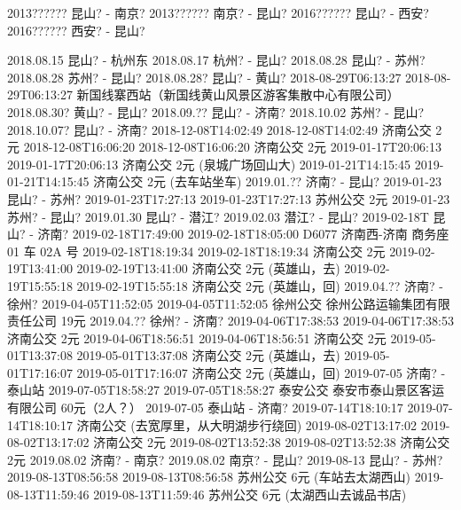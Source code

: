 2013??????       昆山? - 南京?
2013??????       南京? - 昆山?
2016??????       昆山? - 西安?
2016??????       西安? - 昆山?


2018.08.15       昆山? - 杭州东
2018.08.17       杭州? - 昆山?
2018.08.28       昆山? - 苏州?
2018.08.28       苏州? - 昆山?
2018.08.28?      昆山? - 黄山?
2018-08-29T06:13:27 2018-08-29T06:13:27 新国线寨西站（新国线黄山风景区游客集散中心有限公司）
2018.08.30?      黄山? - 昆山?
2018.09.??       昆山? - 济南?
2018.10.02       苏州? - 昆山?
2018.10.07?      昆山? - 济南?
2018-12-08T14:02:49 2018-12-08T14:02:49 济南公交 2元
2018-12-08T16:06:20 2018-12-08T16:06:20 济南公交 2元
2019-01-17T20:06:13 2019-01-17T20:06:13 济南公交 2元 (泉城广场回山大)
2019-01-21T14:15:45 2019-01-21T14:15:45 济南公交 2元 (去车站坐车)
2019.01.??       济南? - 昆山?
2019-01-23       昆山? - 苏州?
2019-01-23T17:27:13 2019-01-23T17:27:13 苏州公交 2元
2019-01-23       苏州? - 昆山?
2019.01.30       昆山? - 潜江?
2019.02.03       潜江? - 昆山?
2019-02-18T      昆山? - 济南?
2019-02-18T17:49:00 2019-02-18T18:05:00 D6077 济南西-济南 商务座 01 车 02A 号
2019-02-18T18:19:34 2019-02-18T18:19:34 济南公交 2元
2019-02-19T13:41:00 2019-02-19T13:41:00 济南公交 2元 (英雄山，去)
2019-02-19T15:55:18 2019-02-19T15:55:18 济南公交 2元 (英雄山，回)
2019.04.??       济南? - 徐州?
2019-04-05T11:52:05 2019-04-05T11:52:05 徐州公交 徐州公路运输集团有限责任公司 19元
2019.04.??       徐州? - 济南?
2019-04-06T17:38:53 2019-04-06T17:38:53 济南公交 2元
2019-04-06T18:56:51 2019-04-06T18:56:51 济南公交 2元
2019-05-01T13:37:08 2019-05-01T13:37:08 济南公交 2元 (英雄山，去)
2019-05-01T17:16:07 2019-05-01T17:16:07 济南公交 2元 (英雄山，回)
2019-07-05       济南? - 泰山站
2019-07-05T18:58:27 2019-07-05T18:58:27 泰安公交 泰安市泰山景区客运有限公司 60元（2人？）
2019-07-05       泰山站 - 济南?
2019-07-14T18:10:17 2019-07-14T18:10:17 济南公交 (去宽厚里，从大明湖步行绕回)
2019-08-02T13:17:02 2019-08-02T13:17:02 济南公交 2元
2019-08-02T13:52:38 2019-08-02T13:52:38 济南公交 2元
2019.08.02       济南? - 南京?
2019.08.02       南京? - 昆山?
2019-08-13       昆山? - 苏州?
2019-08-13T08:56:58 2019-08-13T08:56:58 苏州公交 6元 (车站去太湖西山)
2019-08-13T11:59:46 2019-08-13T11:59:46 苏州公交 6元 (太湖西山去诚品书店)
